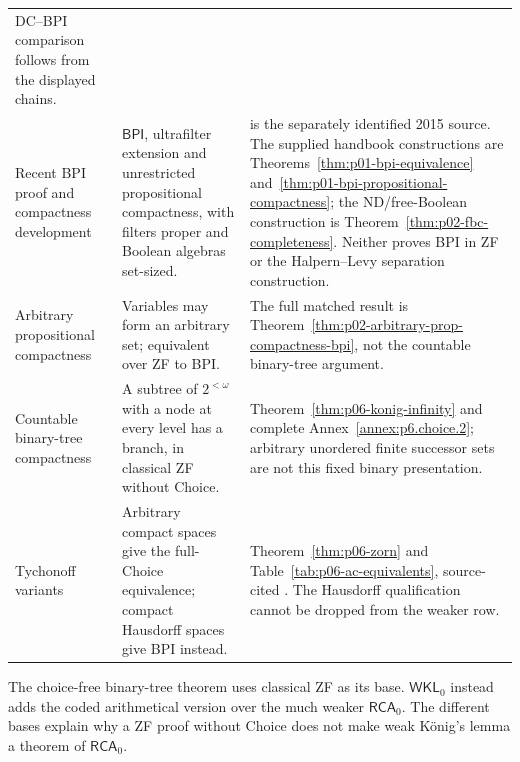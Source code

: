 \begin{longtable}{@{}p{}p{}p{}@{}}
DC--BPI comparison follows from the displayed chains. \\
\addlinespace
Recent BPI proof and compactness development & \(\mathsf{BPI}\),
ultrafilter extension and unrestricted propositional compactness,
with filters proper and Boolean algebras set-sized. &
\cite{Repicky2015BPI} is the separately identified 2015 source.
The supplied handbook constructions are
Theorems~\ref{thm:p01-bpi-equivalence}
and~\ref{thm:p01-bpi-propositional-compactness};
the ND/free-Boolean construction is
Theorem~\ref{thm:p02-fbc-completeness}. Neither proves BPI in ZF
or the Halpern--Levy separation construction. \\
\addlinespace
Arbitrary propositional compactness & Variables may form an arbitrary set;
equivalent over ZF to BPI. &
The full matched result is Theorem~\ref{thm:p02-arbitrary-prop-compactness-bpi},
not the countable binary-tree argument. \\
\addlinespace
Countable binary-tree compactness & A subtree of \(2^{<\omega}\) with a
node at every level has a branch, in classical ZF without Choice. &
Theorem~\ref{thm:p06-konig-infinity} and complete
Annex~\ref{annex:p6.choice.2}; arbitrary unordered finite successor sets
are not this fixed binary presentation. \\
\addlinespace
Tychonoff variants & Arbitrary compact spaces give the full-Choice
equivalence; compact Hausdorff spaces give BPI instead. &
Theorem~\ref{thm:p06-zorn} and Table~\ref{tab:p06-ac-equivalents},
source-cited \cite{Jech1973Choice,HowardRubin1998}. The Hausdorff qualification
cannot be dropped from the weaker row. \\
\bottomrule
\end{longtable}
\endgroup

The choice-free binary-tree theorem uses classical ZF as its base.
\(\mathsf{WKL}_0\) instead adds the coded arithmetical version over the
much weaker \(\mathsf{RCA}_0\). The different bases explain why a ZF
proof without Choice does not make weak K\"onig's lemma a theorem of
\(\mathsf{RCA}_0\).

